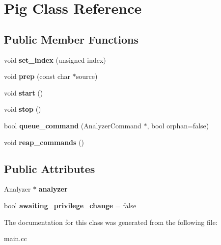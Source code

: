 \hypertarget{class_pig}{}\section{Pig Class Reference}
\label{class_pig}
\subsection*{Public Member Functions}
\begin{DoxyCompactItemize}
\item 
\mbox{\label{class_pig_acb57318fa0df96681d85894f1be08232}} 
void {\bfseries set\+\_\+index} (unsigned index)
\item 
\mbox{\label{class_pig_a642fd1795a1c8967a6ec606ca4f7794d}} 
void {\bfseries prep} (const char $\ast$source)
\item 
\mbox{\label{class_pig_a97db379f78099d9d613511e5aac8f897}} 
void {\bfseries start} ()
\item 
\mbox{\label{class_pig_ae131c6ac3ed9e597dba58607be05610b}} 
void {\bfseries stop} ()
\item 
\mbox{\label{class_pig_aaeb221cc937e13cf7715185634578392}} 
bool {\bfseries queue\+\_\+command} (Analyzer\+Command $\ast$, bool orphan=false)
\item 
\mbox{\label{class_pig_a299673808b754249c11df3971727830b}} 
void {\bfseries reap\+\_\+commands} ()
\end{DoxyCompactItemize}
\subsection*{Public Attributes}
\begin{DoxyCompactItemize}
\item 
\mbox{\label{class_pig_a749cf2c3ea1e5e1892a41ed1ea4d81ba}} 
Analyzer $\ast$ {\bfseries analyzer}
\item 
\mbox{\label{class_pig_a11700ec130a0ef7059b657547c63a618}} 
bool {\bfseries awaiting\+\_\+privilege\+\_\+change} = false
\end{DoxyCompactItemize}


The documentation for this class was generated from the following file\+:\begin{DoxyCompactItemize}
\item 
main.\+cc\end{DoxyCompactItemize}
